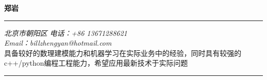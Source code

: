 \documentclass[a4paper,9pt,oneside]{scrartcl}
\newcommand{\Region}{Hong Kong, China}
\newcommand{\bigname}[1]{
    \begin{center}\fontfamily{phv}\selectfont\LARGE\bfseries#1\end{center}
}
\begin{document}
 \selectfont

\begin{CJK*}{UTF8}{gbsn}
\bigname{\Huge 郑岩}

\vspace{-6pt} \rule{\textwidth}{1pt}

\vspace{-1pt} {\small\itshape 北京市朝阳区 \hfill 电话：+86 13671288621\\
       Email：billzhengyan@hotmail.com  %
\\[5pt]}
具备较好的数理建模能力和机器学习在实际业务中的经验，同时具有较强的c++/python编程工程能力，希望应用最新技术于实际问题
\\[-6mm]

\rule{\textwidth}{1pt}

\vspace{6pt}


\end{CJK*}
\end{document}
